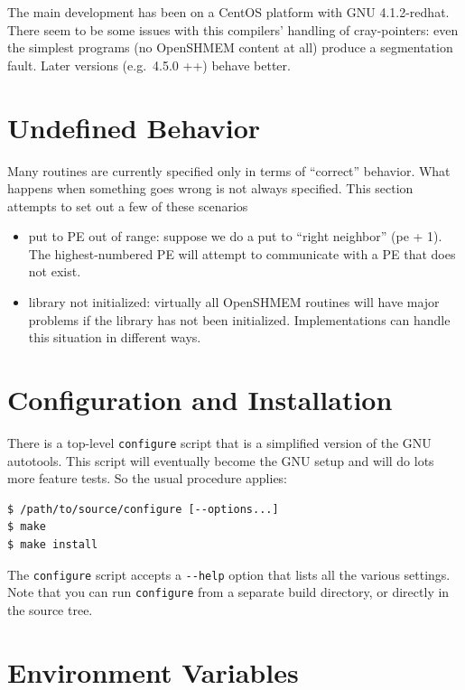 \documentclass[english]{article}
\newcommand{\openshmem} {\mbox{OpenSHMEM}\xspace}
\begin{document}
The main development has been on a CentOS platform with GNU
4.1.2-redhat.  There seem to be some issues with this compilers'
handling of cray-pointers: even the simplest programs (no \openshmem
content at all) produce a segmentation fault. Later versions
(e.g.\ 4.5.0 ++) behave better.

\section{Undefined Behavior}

Many routines are currently specified only in terms of ``correct''
behavior. What happens when something goes wrong is not always
specified.  This section attempts to set out a few of these scenarios
\begin{itemize}
\item put to PE out of range: suppose we do a put to ``right
neighbor'' (pe + 1). The highest-numbered PE will attempt to
communicate with a PE that does not exist.
\item library not initialized: virtually all \openshmem routines will
have major problems if the library has not been
initialized. Implementations can handle this situation in different
ways.
\end{itemize}

\section{Configuration and Installation}

There is a top-level \texttt{configure} script that is a simplified
version of the GNU autotools. This script will eventually become the
GNU setup and will do lots more feature tests. So the usual procedure
applies:

\begin{lstlisting}
$ /path/to/source/configure [--options...]
$ make
$ make install
\end{lstlisting}

The \texttt{configure} script accepts a
\texttt{-{}-help} option that lists all the various settings.  Note
that you can run \texttt{configure} from a separate build directory,
or directly in the source tree.

\section{Environment Variables\label{sec:Environment-Variables}}
\end{document}
